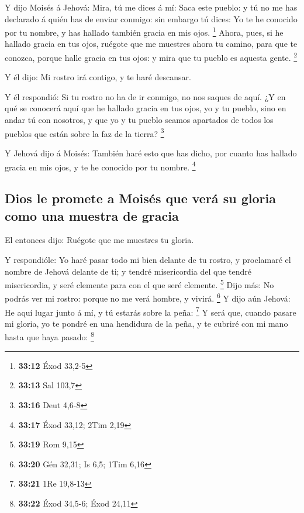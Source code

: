  Y dijo Moisés á Jehová: Mira, tú me dices á mí: Saca este
pueblo: y tú no me has declarado á quién has de enviar conmigo: sin
embargo tú dices: Yo te he conocido por tu nombre, y has hallado también
gracia en mis ojos. \footnote{\textbf{33:12} Éxod 33,2-5} 
Ahora, pues, si he hallado gracia en tus ojos, ruégote que me muestres
ahora tu camino, para que te conozca, porque halle gracia en tus ojos: y
mira que tu pueblo es aquesta gente. \footnote{\textbf{33:13} Sal 103,7}

 Y él dijo: Mi rostro irá contigo, y te haré descansar.

 Y él respondió: Si tu rostro no ha de ir conmigo, no nos
saques de aquí.  ¿Y en qué se conocerá aquí que he hallado
gracia en tus ojos, yo y tu pueblo, sino en andar tú con nosotros, y que
yo y tu pueblo seamos apartados de todos los pueblos que están sobre la
faz de la tierra? \footnote{\textbf{33:16} Deut 4,6-8}

 Y Jehová dijo á Moisés: También haré esto que has dicho,
por cuanto has hallado gracia en mis ojos, y te he conocido por tu
nombre. \footnote{\textbf{33:17} Éxod 33,12; 2Tim 2,19}

\hypertarget{dios-le-promete-a-moisuxe9s-que-veruxe1-su-gloria-como-una-muestra-de-gracia}{%
\subsection{Dios le promete a Moisés que verá su gloria como una muestra
de
gracia}\label{dios-le-promete-a-moisuxe9s-que-veruxe1-su-gloria-como-una-muestra-de-gracia}}

 El entonces dijo: Ruégote que me muestres tu gloria.

 Y respondióle: Yo haré pasar todo mi bien delante de tu
rostro, y proclamaré el nombre de Jehová delante de ti; y tendré
misericordia del que tendré misericordia, y seré clemente para con el
que seré clemente. \footnote{\textbf{33:19} Rom 9,15}  Dijo
más: No podrás ver mi rostro: porque no me verá hombre, y vivirá.
\footnote{\textbf{33:20} Gén 32,31; Is 6,5; 1Tim 6,16}  Y
dijo aún Jehová: He aquí lugar junto á mí, y tú estarás sobre la peña:
\footnote{\textbf{33:21} 1Re 19,8-13}  Y será que, cuando
pasare mi gloria, yo te pondré en una hendidura de la peña, y te cubriré
con mi mano hasta que haya pasado: \footnote{\textbf{33:22} Éxod 34,5-6;
  Éxod 24,11}

